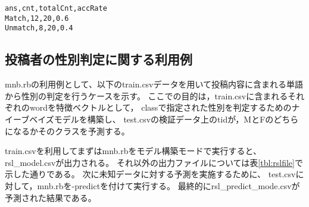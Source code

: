 \begin{Verbatim}[baselinestretch=0.7,frame=single]
ans,cnt,totalCnt,accRate
Match,12,20,0.6
Unmatch,8,20,0.4
\end{Verbatim}


\subsection{投稿者の性別判定に関する利用例}
mnb.rbの利用例として、以下のtrain.csvデータを用いて投稿内容に含まれる単語から性別の判定を行うケースを示す。
ここでの目的は，train.csvに含まれるそれぞれのwordを特徴ベクトルとして，
classで指定された性別を判定するためのナイーブベイズモデルを構築し、
test.csvの検証データ上のtidが，MとFのどちらになるかそのクラスを予測する。

train.csvを利用してまずはmnb.rbをモデル構築モードで実行すると、rsl\_model.csvが出力される。
それ以外の出力ファイルについては表\ref{tbl:rslfile}で示した通りである。
次に未知データに対する予測を実施するために、
test.csvに対して，mnb.rbを-predictを付けて実行する。
最終的にrsl\_predict\_mode.csvが予測された結果である。

\vspace{1cm}


